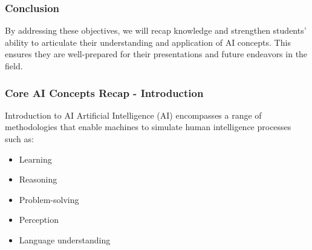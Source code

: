 \documentclass[aspectratio=169]{beamer}
\begin{document}
\begin{frame}
    \frametitle{Conclusion}
    By addressing these objectives, we will recap knowledge and strengthen students' ability to articulate their understanding and application of AI concepts. 
    This ensures they are well-prepared for their presentations and future endeavors in the field. 
\end{frame}

\begin{frame}[fragile]
    \frametitle{Core AI Concepts Recap - Introduction}
    \begin{block}{Introduction to AI}
        Artificial Intelligence (AI) encompasses a range of methodologies that enable machines to simulate human intelligence processes such as:
        \begin{itemize}
            \item Learning
            \item Reasoning
            \item Problem-solving
            \item Perception
            \item Language understanding
        \end{itemize}
    \end{block}
\end{frame}
\end{document}
